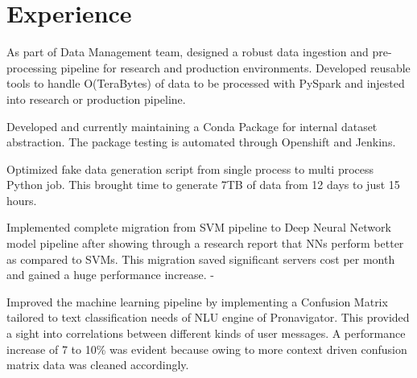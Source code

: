 \documentclass[]{deedy-resume-openfont}
\begin{document}
\hfill
\begin{minipage}[t]{0.63\textwidth} 


\section{Experience}

\vspace{\topsep} %
\begin{tightemize}

\item As part of Data Management team, designed a robust data ingestion and pre-processing pipeline for research and production environments. Developed reusable tools to handle O(TeraBytes) of data to be processed with PySpark and injested into research or production pipeline.

\item Developed and currently maintaining a Conda Package for internal dataset abstraction. The package testing is automated through Openshift and Jenkins.

\item Optimized fake data generation script from single process to multi process Python job. This brought time to generate 7TB of data from 12 days to just 15 hours.

\end{tightemize}
\sectionsep

\vspace{\topsep} %
\begin{tightemize}

\item Implemented complete migration from SVM pipeline to Deep Neural Network model pipeline after showing through a research report that NNs perform better as compared to SVMs.  This migration saved significant servers cost per month and gained a huge performance increase. 
-
\item Improved the machine learning pipeline by implementing a Confusion Matrix tailored to text classification needs of NLU engine of Pronavigator. This provided a sight into correlations between different kinds of user messages. A performance increase of 7 to 10\% was evident because owing to more context driven confusion matrix data was cleaned accordingly.


\end{tightemize}
\end{minipage}
\end{document}
